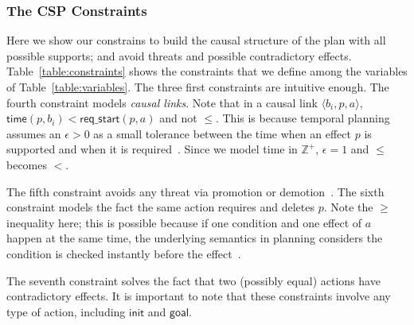 \documentclass{ecai}
\newcommand{\tup}[1]{{\langle #1 \rangle}}
\newcommand{\tim}{\mathsf{time}}   %
\newcommand{\reqs}{\mathsf{req\_{start}}} %
\newcommand{\ini}{\mathsf{init}}   %
\newcommand{\goal}{\mathsf{goal}}  %
\begin{document}
\subsubsection{The CSP Constraints}
Here we show our constrains to build the causal structure of the plan with all possible supports; and avoid threats and possible contradictory effects. Table~\ref{table:constraints} shows the constraints that we define among the variables of Table~\ref{table:variables}. The three first constraints are intuitive enough. The fourth constraint models {\em causal links}. Note that in a causal link $\tup{b_i,p,a}$, $\tim(p,b_i) < \reqs(p,a)$ and not $\leq$. This is because temporal planning assumes an $\epsilon > 0$ as a small tolerance between the time when an effect $p$ is supported and when it is required~\cite{fox2003pddl2}. Since we model time in $\mathbb{Z}^+$, $\epsilon=1$ and $\leq$ becomes $<$.

The fifth constraint avoids any threat via promotion or demotion~\cite{ghallab2004automated}. The sixth constraint models the fact the same action requires and deletes $p$. Note the $\geq$ inequality here; this is possible because if one condition and one effect of $a$ happen at the same time, the underlying semantics in planning considers the condition is checked instantly before the effect~\cite{fox2003pddl2}.

The seventh constraint solves the fact that two (possibly equal) actions have contradictory effects. It is important to note that these constraints involve any type of action, including $\ini$ and $\goal$.
\end{document}
